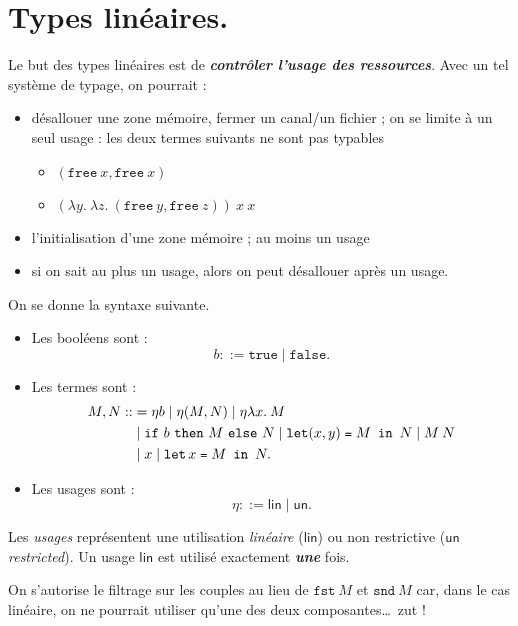 \documentclass[./main]{subfiles}
\begin{document}
  \chapter{Types linéaires.}

  Le but des types linéaires est de \textit{\textbf{contrôler l'usage des ressources}}.
  Avec un tel système de typage, on pourrait :
  \begin{itemize}
    \item désallouer une zone mémoire, fermer un canal/un fichier ; on se limite à un seul usage : les deux termes suivants ne sont pas typables
      \begin{itemize}
        \item $(\mathtt{free}\ x, \mathtt{free}\ x)$
        \item $(\lambda y. \: \lambda z. \: (\mathtt{free}\ y, \mathtt{free}\ z)) \: x \: x$
      \end{itemize}
    \item l'initialisation d'une zone mémoire ; au moins un usage 
    \item si on sait au plus un usage, alors on peut désallouer après un usage.
  \end{itemize}

  On se donne la syntaxe suivante.
  \begin{itemize}
    \item Les booléens sont :
      \[
      b ::= \mathtt{true}  \mid \mathtt{false}
      .\]
    \item Les termes sont :
      \begin{align*}
        M, N ::&= \eta b  \mid \eta (M, N)  \mid \eta \lambda x. \: M\\
               &{}\mid  \ifte b M N  \mid \letin {(x, y)} M N  \mid M \: N\\
               &{} \mid x  \mid \letin x M N
      .\end{align*}
    \item Les usages sont :
      \[
      \eta ::= \mathsf{lin}  \mid  \mathsf{un}
      .\]
  \end{itemize}

  Les \textit{usages} représentent une utilisation \textit{linéaire} ($\mathsf{lin}$) ou non restrictive ($\mathsf{un}$\textit{restricted}).
  Un usage $\mathsf{lin}$ est utilisé exactement \textit{\textbf{une}} fois.

  On s'autorise le filtrage sur les couples au lieu de $\mathtt{fst} \: M$ et $\mathtt{snd}\: M$ car, dans le cas linéaire, on ne pourrait utiliser qu'une des deux composantes\ldots\ zut !
\end{document}
